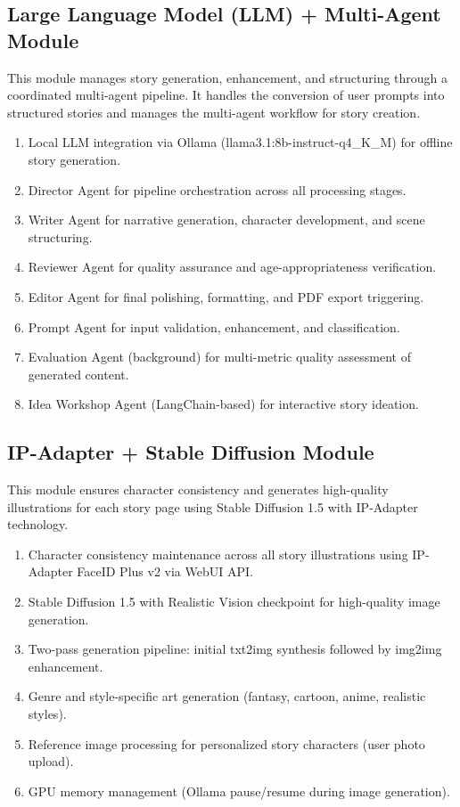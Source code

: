 \subsection{Large Language Model (LLM) + Multi-Agent Module}
This module manages story generation, enhancement, and structuring through a coordinated multi-agent pipeline. It handles the conversion of user prompts into structured stories and manages the multi-agent workflow for story creation.
\begin{enumerate}
    \item Local LLM integration via Ollama (llama3.1:8b-instruct-q4\_K\_M) for offline story generation.
    \item Director Agent for pipeline orchestration across all processing stages.
    \item Writer Agent for narrative generation, character development, and scene structuring.
    \item Reviewer Agent for quality assurance and age-appropriateness verification.
    \item Editor Agent for final polishing, formatting, and PDF export triggering.
    \item Prompt Agent for input validation, enhancement, and classification.
    \item Evaluation Agent (background) for multi-metric quality assessment of generated content.
    \item Idea Workshop Agent (LangChain-based) for interactive story ideation.
\end{enumerate}

\subsection{IP-Adapter + Stable Diffusion Module}
This module ensures character consistency and generates high-quality illustrations for each story page using Stable Diffusion 1.5 with IP-Adapter technology.
\begin{enumerate}
    \item Character consistency maintenance across all story illustrations using IP-Adapter FaceID Plus v2 via WebUI API.
    \item Stable Diffusion 1.5 with Realistic Vision checkpoint for high-quality image generation.
    \item Two-pass generation pipeline: initial txt2img synthesis followed by img2img enhancement.
    \item Genre and style-specific art generation (fantasy, cartoon, anime, realistic styles).
    \item Reference image processing for personalized story characters (user photo upload).
    \item GPU memory management (Ollama pause/resume during image generation).
\end{enumerate}

